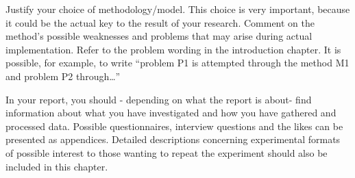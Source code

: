 Justify your choice of methodology/model. This choice is very important, because it could be the actual key to the result of your research. Comment on the method's possible weaknesses and problems that may arise during actual implementation. Refer to the problem wording in the introduction chapter. It is possible, for example, to write “problem P1 is attempted through the method M1 and problem P2 through…” 

In your report, you should - depending on what the report is about- find information about what you have investigated and how you have gathered and processed data. Possible questionnaires, interview questions and the likes can be presented as appendices. Detailed descriptions concerning experimental formats of possible interest to those wanting to repeat the experiment should also be included in this chapter.
\fi
